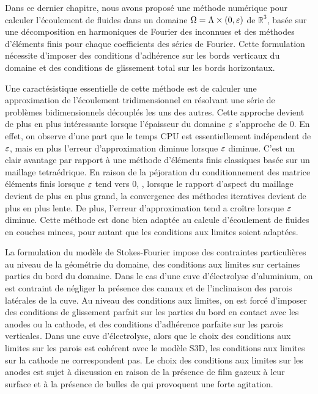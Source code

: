 Dans ce dernier chapitre, nous avons proposé une méthode numérique
pour calculer l'écoulement de fluides dans un domaine
$\Omega = \Lambda\times(0,\varepsilon)$ de $\mathbb R^3$, basée sur une
décomposition en harmoniques de Fourier des inconnues et des
méthodes d'éléments finis pour chaque coefficients des séries de
Fourier. Cette formulation nécessite d'imposer des conditions
d'adhérence sur les bords verticaux du domaine et des conditions de
glissement total sur les bords horizontaux.

Une caractésistique essentielle de cette méthode est de calculer une
approximation de l'écoulement tridimensionnel en résolvant une
série de problèmes bidimensionnels découplés les uns des autres. Cette
approche devient de plus en plus intéressante lorsque l'épaisseur du
domaine $\varepsilon$ s'approche de 0. En effet, on observe d'une part
que le temps CPU est essentiellement indépendent de $\varepsilon$, mais
en plus l'erreur d'approximation diminue lorsque $\varepsilon$
diminue. C'est un clair avantage par rapport à une méthode
d'éléments finis classiques basée sur un maillage tetraédrique. En
raison de la péjoration du conditionnement des matrice éléments
finis lorsque $\varepsilon$ tend vers 0, \ie, lorsque le rapport
d'aspect du maillage devient de plus en plus grand, la convergence des
méthodes iteratives devient de plus en plus lente. De plus, l'erreur
d'approximation tend a croître lorsque $\varepsilon$ diminue.
Cette méthode est donc bien adaptée au calcule d'écoulement de
fluides en couches minces, pour autant que les conditions aux limites
soient adaptées.

La formulation du modèle de Stokes-Fourier impose des contraintes
particulières au niveau de la géométrie du domaine, des conditions
aux limites sur certaines parties du bord du domaine. Dans le cas
d'une cuve d'électrolyse d'aluminium, on est contraint de négliger la
présence des canaux et de l'inclinaison des parois
latérales de la cuve. Au niveau des conditions aux limites, on est
forcé d'imposer des conditions de glissement parfait sur les parties
du bord en contact avec les anodes ou la cathode, et des conditions
d'adhérence parfaite sur les parois verticales. Dans une cuve
d'électrolyse, alors que le choix des conditions aux limites sur les
parois est cohérent avec le modèle S3D, les conditions aux limites sur
la cathode ne correspondent pas. Le choix des conditions aux limites
sur les anodes est sujet à discussion en raison de la présence de
film gazeux à leur surface et à la présence de bulles de 
qui provoquent une forte agitation.

